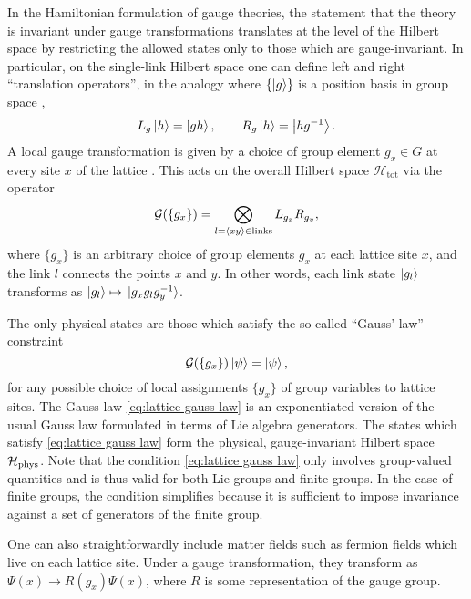 \medskip

In the Hamiltonian formulation of gauge theories, the statement that the theory is invariant under gauge transformations translates at the level of the Hilbert space by restricting the allowed states only to those which are gauge-invariant.
In particular, on the single-link Hilbert space one can define left and right ``translation operators'', in the analogy where $\{\ket{g}\}$ is a position basis in group space \cite{zohar2015latticegauge},
\begin{equation}
    \label{eq:regular representations}
    L_g \ket{h} = \ket{gh}, \quad \quad R_g \ket{h} = \ket{hg^{-1}}.
\end{equation}
A local gauge transformation is given by a choice of group element $g_x \in G$ at every site $x$ of the lattice \cite{milstead2018qyangmills}.
This acts on the overall Hilbert space $\mathcal{H}_{\text{tot}}$ via the operator
\begin{equation}
    \label{eq:gauss law operator}
    \mathcal{G}(\{g_x\}) = \bigotimes_{l=\expval{xy} \in \mathrm{links}} L_{g_{x}} R_{g_y},
\end{equation}
where $\{g_x\}$ is an arbitrary choice of group elements $g_x$ at each lattice site $x$, and the link $l$ connects the points $x$ and $y$.
In other words, each link state $\ket{g_l}$ transforms as $\ket{g_l} \mapsto \ket*{g_x g_l g_y^{-1}}$.

The only physical states are those which satisfy the so-called ``Gauss' law'' constraint \cite{kogut1975hamiltonian, milstead2018qyangmills, tong2018gauge}
\begin{equation}
    \label{eq:lattice gauss law}
    \mathcal{G}(\{g_x\}) \ket{\psi}=\ket{\psi},
\end{equation}
for any possible choice of local assignments $\{g_x\}$ of group variables to lattice sites.
The Gauss law \eqref{eq:lattice gauss law} is an exponentiated version of the usual Gauss law formulated in terms of Lie algebra generators.
The states which satisfy \eqref{eq:lattice gauss law} form the physical, gauge-invariant Hilbert space $\mathcal{H}_{\text{phys}}$.
Note that the condition \eqref{eq:lattice gauss law} only involves group-valued quantities and is thus valid for both Lie groups and finite groups.
In the case of finite groups, the condition simplifies because it is sufficient to impose invariance against a set of generators of the finite group.

One can also straightforwardly include matter fields such as fermion fields which live on each lattice site.
Under a gauge transformation, they transform as $\Psi(x) \to R(g_x) \Psi(x)$, where $R$ is some representation of the gauge group.



